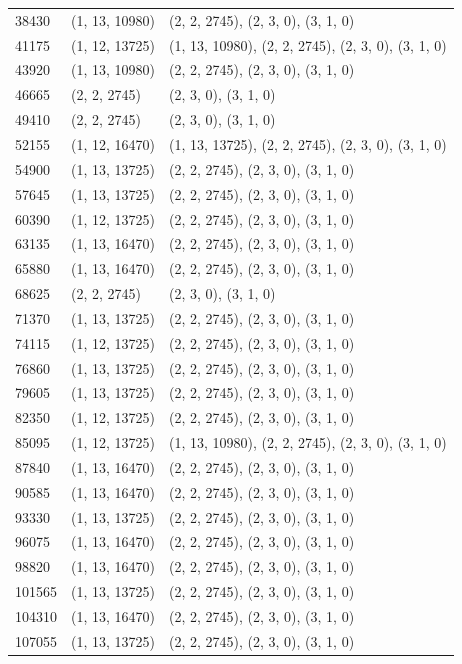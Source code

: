 \documentclass[../main.tex]{subfiles}
\begin{document}
\begin{longtable}[h!t!]{p{0.6in}p{1in}p{4.4in}}
38430 & (1, 13, 10980) & (2, 2, 2745), (2, 3, 0), (3, 1, 0) \\
41175 & (1, 12, 13725) & (1, 13, 10980), (2, 2, 2745), (2, 3, 0), (3, 1, 0) \\
43920 & (1, 13, 10980) & (2, 2, 2745), (2, 3, 0), (3, 1, 0) \\
46665 & (2, 2, 2745) & (2, 3, 0), (3, 1, 0) \\
49410 & (2, 2, 2745) & (2, 3, 0), (3, 1, 0) \\
52155 & (1, 12, 16470) & (1, 13, 13725), (2, 2, 2745), (2, 3, 0), (3, 1, 0) \\
54900 & (1, 13, 13725) & (2, 2, 2745), (2, 3, 0), (3, 1, 0) \\
57645 & (1, 13, 13725) & (2, 2, 2745), (2, 3, 0), (3, 1, 0) \\
60390 & (1, 12, 13725) & (2, 2, 2745), (2, 3, 0), (3, 1, 0) \\
63135 & (1, 13, 16470) & (2, 2, 2745), (2, 3, 0), (3, 1, 0) \\
65880 & (1, 13, 16470) & (2, 2, 2745), (2, 3, 0), (3, 1, 0) \\
68625 & (2, 2, 2745) & (2, 3, 0), (3, 1, 0) \\
71370 & (1, 13, 13725) & (2, 2, 2745), (2, 3, 0), (3, 1, 0) \\
74115 & (1, 12, 13725) & (2, 2, 2745), (2, 3, 0), (3, 1, 0) \\
76860 & (1, 13, 13725) & (2, 2, 2745), (2, 3, 0), (3, 1, 0) \\
79605 & (1, 13, 13725) & (2, 2, 2745), (2, 3, 0), (3, 1, 0) \\
82350 & (1, 12, 13725) & (2, 2, 2745), (2, 3, 0), (3, 1, 0) \\
85095 & (1, 12, 13725) & (1, 13, 10980), (2, 2, 2745), (2, 3, 0), (3, 1, 0) \\
87840 & (1, 13, 16470) & (2, 2, 2745), (2, 3, 0), (3, 1, 0) \\
90585 & (1, 13, 16470) & (2, 2, 2745), (2, 3, 0), (3, 1, 0) \\
93330 & (1, 13, 13725) & (2, 2, 2745), (2, 3, 0), (3, 1, 0) \\
96075 & (1, 13, 16470) & (2, 2, 2745), (2, 3, 0), (3, 1, 0) \\
98820 & (1, 13, 16470) & (2, 2, 2745), (2, 3, 0), (3, 1, 0) \\
101565 & (1, 13, 13725) & (2, 2, 2745), (2, 3, 0), (3, 1, 0) \\
104310 & (1, 13, 16470) & (2, 2, 2745), (2, 3, 0), (3, 1, 0) \\
107055 & (1, 13, 13725) & (2, 2, 2745), (2, 3, 0), (3, 1, 0) \\

\end{longtable}
\end{document}
